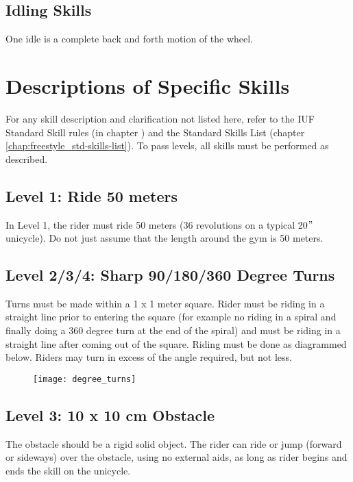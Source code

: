 \subsection{Idling Skills}
One idle is a complete back and forth motion of the wheel.

\section{Descriptions of Specific Skills}
For any skill description and clarification not listed here, refer to the IUF Standard Skill rules (in chapter \label{chap:freestyle_std-skill-rules}) and the Standard Skills List (chapter \ref{chap:freestyle_std-skills-list}).
To pass levels, all skills must be performed as described.

\subsection{Level 1: Ride 50 meters}
In Level 1, the rider must ride 50 meters (36 revolutions on a typical 20$"$ unicycle).
Do not just assume that the length around the gym is 50 meters.

\subsection{Level 2/3/4: Sharp 90/180/360 Degree Turns}
Turns must be made within a 1 x 1 meter square.
Rider must be riding in a straight line prior to entering the square (for example no riding in a spiral and finally doing a 360 degree turn at the end of the spiral) and must be riding in a straight line after coming out of the square.
Riding must be done as diagrammed below.
Riders may turn in excess of the angle required, but not less.

\begin{figure}[h]
\begin{center}
\texttt{[image: degree\_turns]}
\end{center}
\vspace{-20pt}
\vspace{-10pt}
\end{figure}
 
\subsection{Level 3: 10 x 10 cm Obstacle}
The obstacle should be a rigid solid object.
The rider can ride or jump (forward or sideways) over the obstacle, using no external aids, as long as rider begins and ends the skill on the unicycle.

